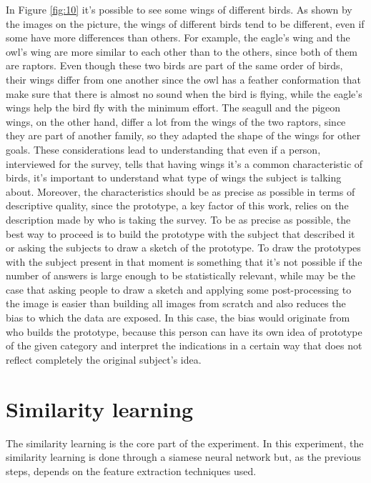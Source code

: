 \documentclass[conference]{IEEEtran}
\begin{document}
			\noindent In Figure \ref{fig:10} it's possible to see some wings of different birds. As shown by the images on the picture, the wings of different birds tend to be different, even if some have more 
			differences than others. For example, the eagle's wing and the owl's wing are more similar to each other than to the others, since both of them are raptors. Even though these two birds are part of 
			the same order of birds, their wings differ from one another since the owl has a feather conformation that make sure that there is almost no sound when the bird is flying, while the eagle's wings 
			help the bird fly with the minimum effort. The seagull and the pigeon wings, on the other hand, differ a lot from the wings of the two raptors, since they are part of another family, so they adapted 
			the shape of the wings for other goals. These considerations lead to understanding that even if a person, interviewed for the survey, tells that having wings it's a common characteristic of birds, 
			it's important to understand what type of wings the subject is talking about. Moreover, the characteristics should be as precise as possible in terms of descriptive quality, since the prototype, a 
			key factor of this work, relies on the description made by who is taking the survey. To be as precise as possible, the best way to proceed is to build the prototype with the subject that described it 
			or asking the subjects to draw a sketch of the prototype. To draw the prototypes with the subject present in that moment is something that it's not possible if the number of answers is large 
			enough to be statistically relevant, while may be the case that asking people to draw a sketch and applying some post-processing to the image is easier than building all images from scratch and also 
			reduces the bias to which the data are exposed. In this case, the bias would originate from who builds the prototype, because this person can have its own idea of prototype of the given category and 
			interpret the indications in a certain way that does not reflect completely the original subject's idea. 

	\section{Similarity learning}
	
		\noindent The similarity learning is the core part of the experiment. In this experiment, the similarity learning is done through a siamese neural network but, as the previous steps, depends on the 
		feature extraction techniques used. 
		
\end{document}
